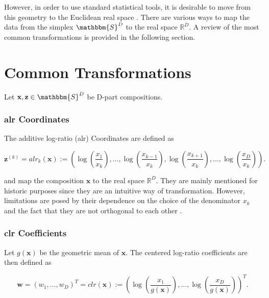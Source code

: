 However, in order to use standard statistical tools, it is desirable to move from this geometry to the Euclidean real space \cite{Filzmoser:2020}. There are various ways to map the data from the simplex $\mathbbm{S}^D$ to the real space $\mathbb{R}^D$. A review of the most common transformations is provided in the following section.

\section{Common Transformations}
\label{sec: Common Transformations}

Let $\textbf{x}, \textbf{z} \in \mathbbm{S}^D$ be D-part compositions.
\subsubsection{alr Coordinates}
\label{sec:alr Coordinates}

The additive log-ratio (alr) Coordinates are defined as \cite{Kynclova:2015}

\begin{equation}
\textbf{z}^{(k)} = alr_k(\textbf{x}) := \left(\log\left(\frac{x_1}{x_k}\right), \ldots, \log\left(\frac{x_{k-1}}{x_k}\right),\log\left(\frac{x_{k+1}}{x_k}\right),\ldots,\log\left(\frac{x_D}{x_k}\right)\right).
\label{eq:alr Coordinates}
\end{equation}

and map the composition $\textbf{x}$ to the real space $\mathbb{R}^D$. They are mainly mentioned for historic purposes since they are an intuitive way of transformation. However, limitations are posed by their dependence on the choice of the denominator $x_k$ and the fact that they are not orthogonal to each other \cite{Filzmoser:2020}. 

\subsubsection{clr Coefficients}
\label{sec:clr Coefficients}

Let $g(\textbf{x})$ be the geometric mean of $\textbf{x}$. The centered log-ratio coefficients are then defined as \cite{Kynclova:2015}

\begin{equation}
\textbf{w} = (w_1,\ldots, w_D)^T = clr(\textbf{x}) := \left(\log\left(\frac{x_1}{g(\textbf{x})}\right),\ldots, \log\left(\frac{x_D}{g(\textbf{x})}\right)\right)^T.
\label{eq:clr Coefficients}
\end{equation}

